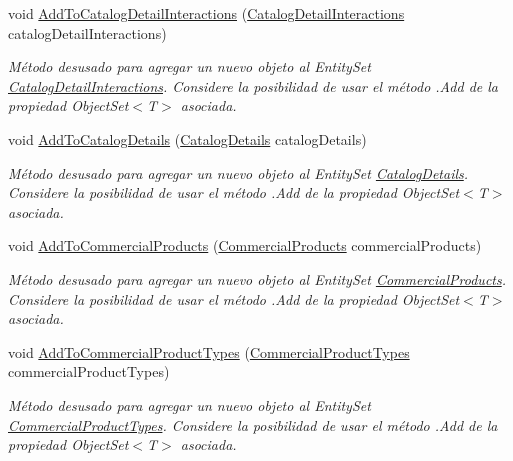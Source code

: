 \begin{DoxyCompactItemize}
void \hyperlink{class_game_memory_1_1_o_m_k_t_d_b_entities_abb21e3cf4428cb1d6d85685e10b973c4}{Add\-To\-Catalog\-Detail\-Interactions} (\hyperlink{class_game_memory_1_1_catalog_detail_interactions}{Catalog\-Detail\-Interactions} catalog\-Detail\-Interactions)
\begin{DoxyCompactList}\small\item\em Método desusado para agregar un nuevo objeto al Entity\-Set \hyperlink{class_game_memory_1_1_catalog_detail_interactions}{Catalog\-Detail\-Interactions}. Considere la posibilidad de usar el método .Add de la propiedad Object\-Set$<$T$>$ asociada. \end{DoxyCompactList}\item 
void \hyperlink{class_game_memory_1_1_o_m_k_t_d_b_entities_a64cd8667b4656b326a730d8fa864050e}{Add\-To\-Catalog\-Details} (\hyperlink{class_game_memory_1_1_catalog_details}{Catalog\-Details} catalog\-Details)
\begin{DoxyCompactList}\small\item\em Método desusado para agregar un nuevo objeto al Entity\-Set \hyperlink{class_game_memory_1_1_catalog_details}{Catalog\-Details}. Considere la posibilidad de usar el método .Add de la propiedad Object\-Set$<$T$>$ asociada. \end{DoxyCompactList}\item 
void \hyperlink{class_game_memory_1_1_o_m_k_t_d_b_entities_aa04f123e04bb601e9b114809de7e75b7}{Add\-To\-Commercial\-Products} (\hyperlink{class_game_memory_1_1_commercial_products}{Commercial\-Products} commercial\-Products)
\begin{DoxyCompactList}\small\item\em Método desusado para agregar un nuevo objeto al Entity\-Set \hyperlink{class_game_memory_1_1_commercial_products}{Commercial\-Products}. Considere la posibilidad de usar el método .Add de la propiedad Object\-Set$<$T$>$ asociada. \end{DoxyCompactList}\item 
void \hyperlink{class_game_memory_1_1_o_m_k_t_d_b_entities_a2e9e997768e7ede8269216f36b7bc8c1}{Add\-To\-Commercial\-Product\-Types} (\hyperlink{class_game_memory_1_1_commercial_product_types}{Commercial\-Product\-Types} commercial\-Product\-Types)
\begin{DoxyCompactList}\small\item\em Método desusado para agregar un nuevo objeto al Entity\-Set \hyperlink{class_game_memory_1_1_commercial_product_types}{Commercial\-Product\-Types}. Considere la posibilidad de usar el método .Add de la propiedad Object\-Set$<$T$>$ asociada. \end{DoxyCompactList}\item 

\end{DoxyCompactItemize}
